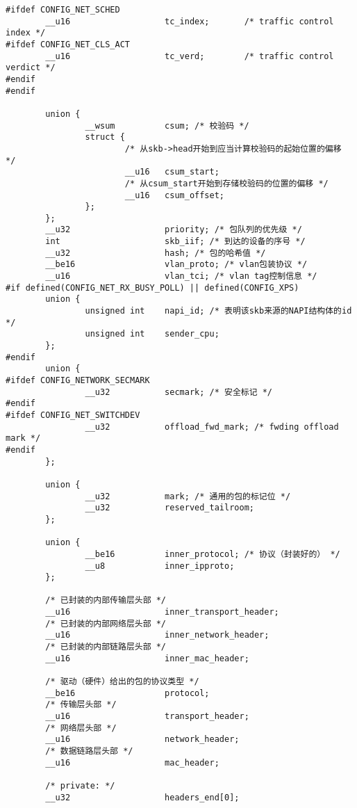 \begin{verbatim}
#ifdef CONFIG_NET_SCHED
        __u16                   tc_index;       /* traffic control index */
#ifdef CONFIG_NET_CLS_ACT
        __u16                   tc_verd;        /* traffic control verdict */
#endif
#endif

        union {
                __wsum          csum; /* 校验码 */
                struct {
                        /* 从skb->head开始到应当计算校验码的起始位置的偏移 */
                        __u16   csum_start; 
                        /* 从csum_start开始到存储校验码的位置的偏移 */
                        __u16   csum_offset;
                };
        };
        __u32                   priority; /* 包队列的优先级 */
        int                     skb_iif; /* 到达的设备的序号 */
        __u32                   hash; /* 包的哈希值 */
        __be16                  vlan_proto; /* vlan包装协议 */
        __u16                   vlan_tci; /* vlan tag控制信息 */
#if defined(CONFIG_NET_RX_BUSY_POLL) || defined(CONFIG_XPS)
        union {
                unsigned int    napi_id; /* 表明该skb来源的NAPI结构体的id */
                unsigned int    sender_cpu;
        };
#endif
        union {
#ifdef CONFIG_NETWORK_SECMARK
                __u32           secmark; /* 安全标记 */
#endif
#ifdef CONFIG_NET_SWITCHDEV
                __u32           offload_fwd_mark; /* fwding offload mark */
#endif
        };

        union {
                __u32           mark; /* 通用的包的标记位 */
                __u32           reserved_tailroom;
        };

        union {
                __be16          inner_protocol; /* 协议（封装好的） */
                __u8            inner_ipproto;
        };

        /* 已封装的内部传输层头部 */
        __u16                   inner_transport_header; 
        /* 已封装的内部网络层头部 */
        __u16                   inner_network_header; 
        /* 已封装的内部链路层头部 */
        __u16                   inner_mac_header;

        /* 驱动（硬件）给出的包的协议类型 */
        __be16                  protocol;
        /* 传输层头部 */
        __u16                   transport_header;
        /* 网络层头部 */
        __u16                   network_header;
        /* 数据链路层头部 */
        __u16                   mac_header;

        /* private: */
        __u32                   headers_end[0];
\end{verbatim}

